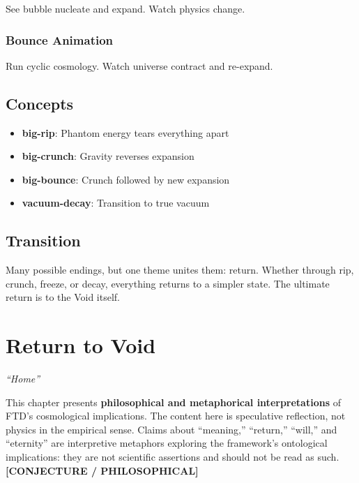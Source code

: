 \documentclass[
  11pt,
  letterpaper,
  twoside,
  openright]{book}
\providecommand{\tightlist}{%
  \setlength{\itemsep}{0pt}\setlength{\parskip}{0pt}}
\begin{document}
See bubble nucleate and expand. Watch physics change.

\subsection{Bounce Animation}\label{bounce-animation}

Run cyclic cosmology. Watch universe contract and re-expand.

\section{Concepts}\label{concepts-43}

\begin{itemize}
\tightlist
\item
  \textbf{big-rip}: Phantom energy tears everything apart
\item
  \textbf{big-crunch}: Gravity reverses expansion
\item
  \textbf{big-bounce}: Crunch followed by new expansion
\item
  \textbf{vacuum-decay}: Transition to true vacuum
\end{itemize}

\section{Transition}\label{transition-44}

Many possible endings, but one theme unites them: return. Whether
through rip, crunch, freeze, or decay, everything returns to a simpler
state. The ultimate return is to the Void itself.

\chapter{Return to Void}\label{sec-return-to-void}

\emph{``Home''}

\begin{tcolorbox}[enhanced jigsaw, coltitle=black, colbacktitle=quarto-callout-warning-color!10!white, toprule=.15mm, colframe=quarto-callout-warning-color-frame, arc=.35mm, opacityback=0, bottomtitle=1mm, toptitle=1mm, breakable, colback=white, titlerule=0mm, opacitybacktitle=0.6, title=\textcolor{quarto-callout-warning-color}{\faExclamationTriangle}\hspace{0.5em}{Philosophical Reflection: Not Physics}, rightrule=.15mm, bottomrule=.15mm, leftrule=.75mm, left=2mm]

This chapter presents \textbf{philosophical and metaphorical
interpretations} of FTD's cosmological implications. The content here is
speculative reflection, not physics in the empirical sense. Claims about
``meaning,'' ``return,'' ``will,'' and ``eternity'' are interpretive
metaphors exploring the framework's ontological implications: they are
not scientific assertions and should not be read as such.
\textbf{{[}CONJECTURE / PHILOSOPHICAL{]}}

\end{tcolorbox}
\end{document}
